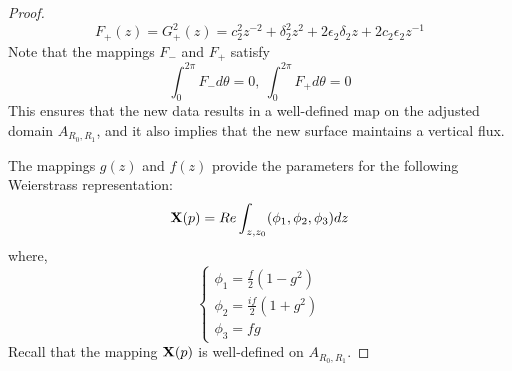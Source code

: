 \documentclass[11pt]{amsart}
\numberwithin{equation}{section}
\theoremstyle{theorem}
\theoremstyle{definition}
\numberwithin{equation}{section}
\begin{document}
\begin{proof}
    $$
    F_+(z)=G_+^2(z)=c_2^2z^{-2}+\delta_2^2z^2+2\epsilon_2 \delta_2 z+2c_2\epsilon_2z^{-1}
    $$
    Note that the mappings $F_-$ and $F_+$ satisfy
    $$
    \int_0^{2\pi} F_- d\theta =0,\ \int_0^{2\pi} F_+ d\theta =0
    $$
    This ensures that the new data results in a well-defined map on the adjusted domain $A_{R_0,R_1}$, and it also implies that the new surface maintains a vertical flux.
   \medskip
   
    The mappings $g(z)$ and $f(z)$ provide the parameters for the following Weierstrass representation:
    $$
    \bold{X}(p) = Re \int_{z,z_0} (\phi_1,\phi_2,\phi_3)dz
    $$
    where,
    $$
    \begin{cases}
        \phi_1=\frac{f}{2}(1-g^2) \\
        \phi_2=\frac{if}{2} (1+g^2) \\
        \phi_3 =fg
    \end{cases}
    $$
    Recall that the mapping $\bold{X}(p)$ is well-defined on $A_{R_0,R_1}$. 
    \medskip
    

\end{proof}
\end{document}
